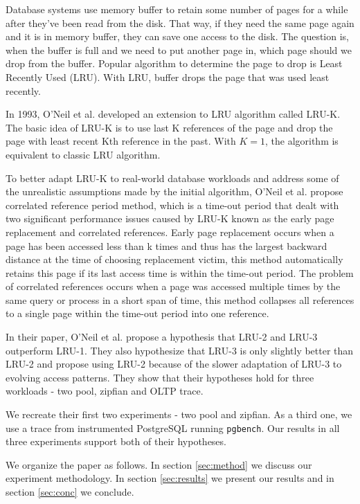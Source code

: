 Database systems use memory buffer to retain some number of pages for a while after they've been read from the disk. That way, if they need the same page again and it is in memory buffer, they can save one access to the disk. The question is, when the buffer is full and we need to put another page in, which page should we drop from the buffer. Popular algorithm to determine the page to drop is Least Recently Used (LRU). With LRU, buffer drops the page that was used least recently.

In 1993, O'Neil et al. \cite{lruk} developed an extension to LRU algorithm called LRU-K. The basic idea of LRU-K is to use last K references of the page and drop the page with least recent Kth reference in the past. With $K = 1$, the algorithm is equivalent to classic LRU algorithm.

To better adapt LRU-K to real-world database workloads and address some of the unrealistic assumptions made by the initial algorithm, O'Neil et al. propose correlated reference period method, which is a time-out period that dealt with two significant performance issues caused by LRU-K known as the early page replacement and correlated references. Early page replacement occurs when a page has been accessed less than k times and thus has the largest backward distance at the time of choosing replacement victim, this method automatically retains this page if its last access time is within the time-out period. The problem of correlated references occurs when a page was accessed multiple times by the same query or process in a short span of time, this method collapses all references to a single page within the time-out period into one reference.

In their paper, O'Neil et al. propose a hypothesis that LRU-2 and LRU-3 outperform LRU-1. They also hypothesize that LRU-3 is only slightly better than LRU-2 and propose using LRU-2 because of the slower adaptation of LRU-3 to evolving access patterns. They show that their hypotheses hold for three workloads - two pool, zipfian and OLTP trace.

We recreate their first two experiments - two pool and zipfian. As a third one, we use a trace from instrumented PostgreSQL running \texttt{pgbench}. Our results in all three experiments support both of their hypotheses.

We organize the paper as follows. In section \ref{sec:method} we discuss our experiment methodology. In section \ref{sec:results} we present our results and in section \ref{sec:conc} we conclude.
